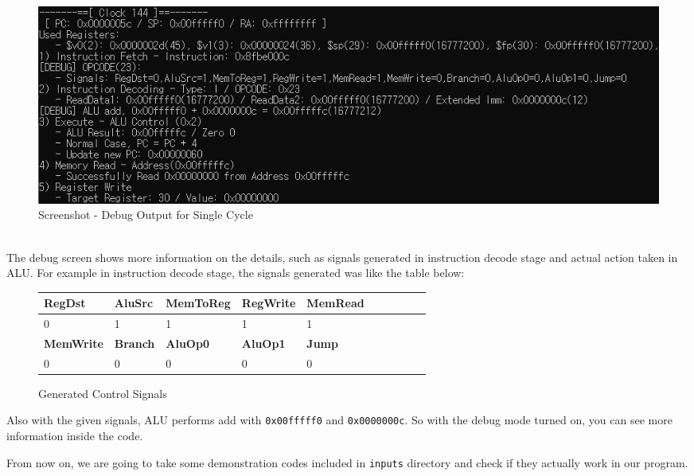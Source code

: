 \documentclass{homework}
\begin{document}
\begin{figure}[h]
\begin{center}
\includegraphics[scale=0.7]{screenshot_4.png}    
\caption{Screenshot - Debug Output for Single Cycle}
\end{center}
\end{figure}
\\
The debug screen shows more information on the details, such as signals generated in instruction decode stage and actual action taken in ALU. For example in instruction decode stage, the signals generated was like the table below:

\begin{figure}[h]
\begin{center}
\begin{tabular}{|l|l|l|l|l|l|l|l|l|l|}
    \hline
    \textbf{RegDst} & \textbf{AluSrc} & \textbf{MemToReg} & \textbf{RegWrite} & \textbf{MemRead} \\
    \hline
    0 & 1 & 1 & 1 & 1 \\
    \hline
    \textbf{MemWrite} & \textbf{Branch} & \textbf{AluOp0} & \textbf{AluOp1} & \textbf{Jump} \\
    \hline
    0 & 0 & 0 & 0 & 0 \\
    \hline
\end{tabular}
\caption{Generated Control Signals}
\end{center}
\end{figure}
Also with the given signals, ALU performs add with \texttt{0x00fffff0} and \texttt{0x0000000c}. So with the debug mode turned on, you can see more information inside the code.

From now on, we are going to take some demonstration codes included in \texttt{inputs} directory and check if they actually work in our program.

\end{document}
